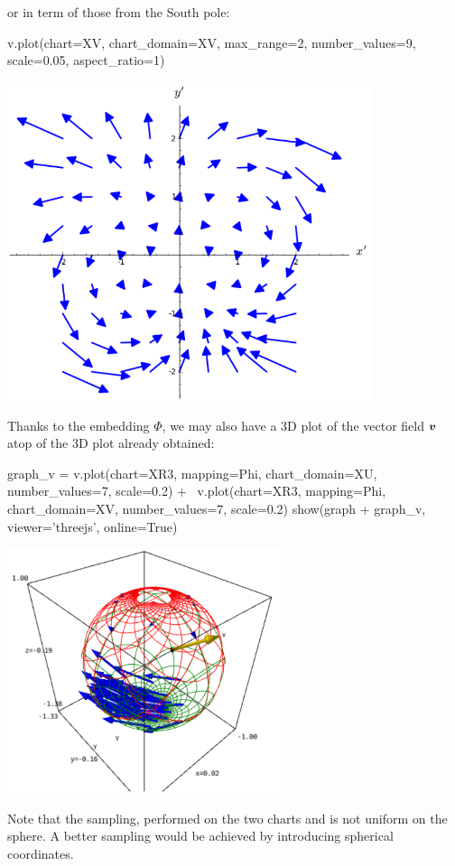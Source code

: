 or in term of those from the South pole:
\begin{NBin}
v.plot(chart=XV, chart_domain=XV, max_range=2,
       number_values=9, scale=0.05, aspect_ratio=1)
\end{NBin}
\begin{center}
\includegraphics[width=0.8\textwidth]{plot_v_South.png}
\end{center}
Thanks to the embedding $\Phi$, we may also have a 3D plot of the vector
field $\bm{v}$
atop of the 3D plot already obtained:
\begin{NBin}
graph_v = v.plot(chart=XR3, mapping=Phi, chart_domain=XU,
                 number_values=7, scale=0.2) + \
          v.plot(chart=XR3, mapping=Phi, chart_domain=XV,
                 number_values=7, scale=0.2)
show(graph + graph_v, viewer='threejs', online=True)
\end{NBin}
\begin{center}
\includegraphics[width=0.6\textwidth]{plot_v_3d.png}
\end{center}
Note that the sampling, performed on the two charts  and 
is not uniform on the sphere. A better sampling would be achieved by introducing
spherical coordinates.

